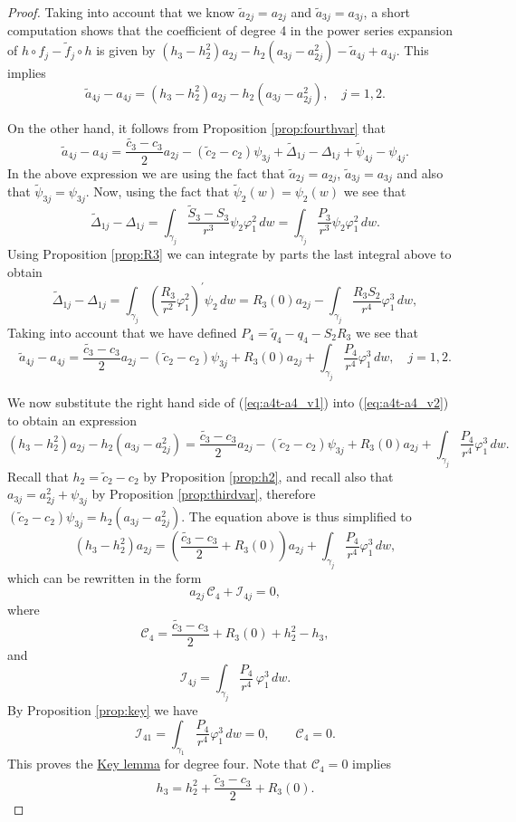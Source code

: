 \begin{proof}
Taking into account that we know $\tilde{a}_{2j}=a_{2j}$ and $\tilde{a}_{3j}=a_{3j}$, a short computation shows that the coefficient of degree 4 in the power series expansion of $h\circ f_j-\tilde{f}_j\circ h$ is given by $(h_3-h_2^2)a_{2j}-h_2(a_{3j}-a_{2j}^2)-\tilde{a}_{4j}+a_{4j}$. This implies
\begin{equation}\label{eq:a4t-a4_v1}
 \tilde{a}_{4j}-a_{4j}=(h_3-h_2^2)a_{2j}-h_2(a_{3j}-a_{2j}^2), \quad j=1,2. 
\end{equation}

On the other hand, it follows from Proposition \ref{prop:fourthvar} that
\[ \tilde{a}_{4j}-a_{4j}=\frac{\tilde{c_3}-c_3}{2}a_{2j}-(\tilde{c}_2-c_2)\psi_{3j}+\widetilde{\Delta}_{1j}-\Delta_{1j}+\widetilde{\psi}_{4j}-\psi_{4j}. \]
In the above expression we are using the fact that $\tilde{a}_{2j}=a_{2j}$, $\tilde{a}_{3j}=a_{3j}$ and also that $\widetilde{\psi}_{3j}=\psi_{3j}$. Now, using the fact that $\widetilde{\psi}_2(w)=\psi_2(w)$ we see that
\[ \widetilde{\Delta}_{1j}-\Delta_{1j}=\int_{\gamma_j}\frac{\widetilde{S}_3-S_3}{r^3}\psi_2\varphi_1^2\,dw=\int_{\gamma_j}\frac{P_3}{r^3}\psi_2\varphi_1^2\,dw. \]
Using Proposition \ref{prop:R3} we can integrate by parts the last integral above to obtain
\begin{equation}\label{formula:Delta1t-Delta1} \widetilde{\Delta}_{1j}-\Delta_{1j}=\int_{\gamma_j}\left(\frac{R_3}{r^2}\varphi_1^2\right)^\prime\psi_2\,dw= R_3(0)a_{2j}-\int_{\gamma_j}\frac{R_3S_2}{r^4}\varphi_1^3\,dw, 
\end{equation}
Taking into account that we have defined $P_4=\tilde{q}_4-q_4-S_2R_3$ we see that
\begin{equation}\label{eq:a4t-a4_v2}
\tilde{a}_{4j}-a_{4j}=\frac{\tilde{c_3}-c_3}{2}a_{2j}-(\tilde{c}_2-c_2)\psi_{3j}+R_3(0)a_{2j}+\int_{\gamma_j}\frac{P_4}{r^4}\varphi_1^3\,dw, \quad j=1,2.
\end{equation}

We now substitute the right hand side of (\ref{eq:a4t-a4_v1}) into (\ref{eq:a4t-a4_v2}) to obtain an expression
\[ (h_3-h_2^2)a_{2j}-h_2(a_{3j}-a_{2j}^2)=\frac{\tilde{c_3}-c_3}{2}a_{2j}-(\tilde{c}_2-c_2)\psi_{3j}+R_3(0)a_{2j}+\int_{\gamma_j}\frac{P_4}{r^4}\varphi_1^3\,dw. \]
Recall that $h_2=\tilde{c}_2-c_2$ by Proposition \ref{prop:h2}, and recall also that $a_{3j}=a_{2j}^2+\psi_{3j}$ by Proposition \ref{prop:thirdvar}, therefore $(\tilde{c}_2-c_2)\psi_{3j}=h_2(a_{3j}-a_{2j}^2)$. The equation above is thus simplified to
\[ (h_3-h_2^2)a_{2j}=\left(\frac{\tilde{c_3}-c_3}{2}+R_3(0)\right)a_{2j}+\int_{\gamma_j}\frac{P_4}{r^4}\varphi_1^3\,dw, \]
which can be rewritten in the form
\[ a_{2j}\,\mathcal{C}_4+\mathcal{I}_{4j}=0, \]
where
\[ \mathcal{C}_4=\frac{\tilde{c_3}-c_3}{2}+R_3(0)+h_2^2-h_3, \]
and
\[ \mathcal{I}_{4j}=\int_{\gamma_j}\frac{P_4}{r^4}\,\varphi_1^3\,dw. \]
By Proposition \ref{prop:key} we have 
\[ \mathcal{I}_{41}=\int_{\gamma_1}\frac{P_4}{r^4}\varphi_1^3\,dw=0, \qquad \mathcal{C}_4=0. \]
This proves the \hyperref[lemma:key]{Key lemma} for degree four. Note that $\mathcal{C}_4=0$ implies
\[ h_3=h_2^2+\frac{\tilde{c}_3-c_3}{2}+R_3(0). \]
\end{proof}

